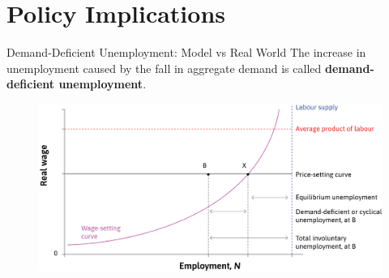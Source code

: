 \documentclass[11pt,aspectratio=43,usenames,dvipsnames]{beamer}
\theoremstyle{definition}
\begin{document}
\section[Policy]{Policy Implications}
\label{sec:Policy_Implications}


\begin{frame}[allowframebreaks]{Demand-Deficient Unemployment: Model vs Real World}
\label{slide:Demand_Deficient_Unemployment__Model_v_s__Real_World}
    The increase in unemployment caused by the \alert{fall in aggregate demand} is called \textbf{demand-deficient unemployment}.

        \begin{figure}
            \centering
            \includegraphics[width=\textwidth]{./figures/DemandDeficientUnemployment.png}
        \end{figure}

    \framebreak


\end{frame}
\end{document}
